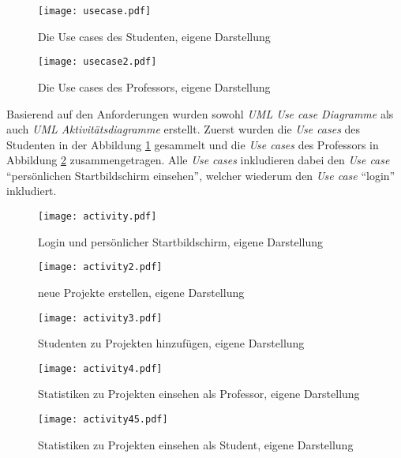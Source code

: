 \documentclass[11pt,a4paper]{report}
\begin{document}
\begin{figure}[htpb]
  \centering
  \texttt{[image: usecase.pdf]}
  \caption{Die Use cases des Studenten, eigene Darstellung}
  \label{f:usecase1}
\end{figure}


\begin{figure}[htpb]
  \centering
  \texttt{[image: usecase2.pdf]}
  \caption{Die Use cases des Professors, eigene Darstellung}
  \label{f:usecase2}
\end{figure}

Basierend auf den Anforderungen wurden sowohl \textit{UML Use case Diagramme} als auch \textit{UML Aktivitätsdiagramme} erstellt. Zuerst wurden die \textit{Use cases} des Studenten in der Abbildung \ref{f:usecase1} gesammelt und die \textit{Use cases} des Professors in Abbildung \ref{f:usecase2} zusammengetragen. Alle \textit{Use cases} inkludieren dabei den \textit{Use case} "`persönlichen Startbildschirm einsehen"', welcher wiederum den \textit{Use case} "`login"' inkludiert.

\begin{figure}[htpb]
  \centering
  \texttt{[image: activity.pdf]}
  \caption{Login und persönlicher Startbildschirm, eigene Darstellung}
  \label{f:login}
\end{figure}


\begin{figure}[htpb]
  \centering
  \texttt{[image: activity2.pdf]}
  \caption{neue Projekte erstellen, eigene Darstellung}
  \label{f:projekt}
\end{figure}

\begin{figure}[htpb]
  \centering
  \texttt{[image: activity3.pdf]}
  \caption{Studenten zu Projekten hinzufügen, eigene Darstellung}
  \label{f:projektstud}
\end{figure}

\begin{figure}[htpb]
  \centering
  \texttt{[image: activity4.pdf]}
  \caption{Statistiken zu Projekten einsehen als Professor, eigene Darstellung}
  \label{f:projektstat}
\end{figure}

\begin{figure}[htpb]
  \centering
  \texttt{[image: activity45.pdf]}
  \caption{Statistiken zu Projekten einsehen als Student, eigene Darstellung}
  \label{f:projektstatstud}
\end{figure}
\end{document}
